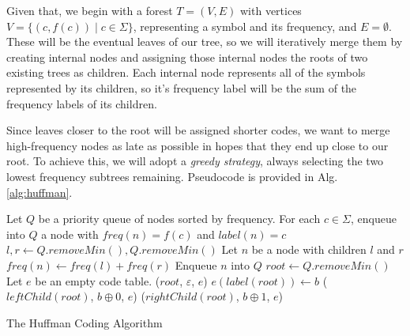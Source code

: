 \documentclass[10pt, twocolumn]{article}
\theoremstyle{prob}
\theoremstyle{definition}
\begin{document}
    Given that, we begin with a forest $T = (V, E)$ with vertices $V = \{(c, f(c)) \mid c \in \Sigma\}$, representing a symbol and its frequency, and $E = \emptyset$. These will be the eventual leaves of our tree, so we will iteratively merge them by creating internal nodes and assigning those internal nodes the roots of two existing trees as children. Each internal node represents all of the symbols represented by its children, so it's frequency label will be the sum of the frequency labels of its children. 
    
    Since leaves closer to the root will be assigned shorter codes, we want to merge high-frequency nodes as late as possible in hopes that they end up close to our root. To achieve this, we will adopt a \textit{greedy strategy}, always selecting the two lowest frequency subtrees remaining. Pseudocode is provided in Alg. \ref{alg:huffman}.
    
    \begin{algorithm*}
        \begin{algorithmic}
        \State Let $Q$ be a priority queue of nodes sorted by frequency. 
        \State For each $c \in \Sigma$, enqueue into $Q$ a node with $freq(n) = f(c)$ and $label(n) = c$ 
            \State $l, r \gets Q.removeMin(), Q.removeMin()$ 
            \State Let $n$ be a node with children $l$ and $r$ 
            \State $freq(n) \gets freq(l) + freq(r)$
            \State Enqueue $n$ into $Q$
        \EndWhile
        \State $root \gets Q.removeMin()$
        \State Let $e$ be an empty code table.
        \State \Return {}($root$, $\varepsilon$, $e$) 
        \EndFunction
                \State $e(label(root)) \gets b$
            \EndIf
            \State {}($leftChild(root)$, $b \oplus 0$, $e$)
            \State {}($rightChild(root)$, $b \oplus 1$, $e$)
        \EndFunction
    \end{algorithmic}
    \caption{The Huffman Coding Algorithm}
    \label{alg:huffman}
    \end{algorithm*}
\end{document}
